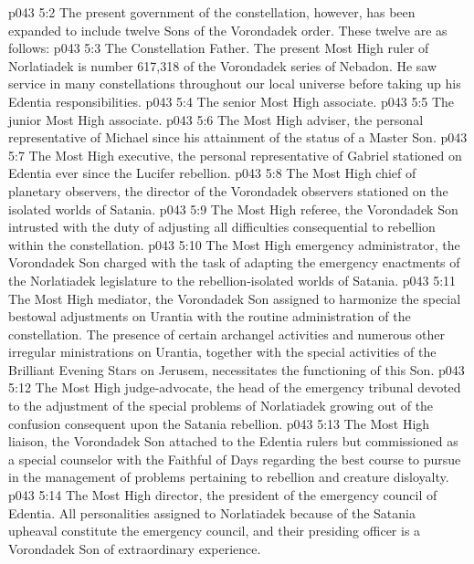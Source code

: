 \vs p043 5:2 The present government of the constellation, however, has been expanded to include twelve Sons of the Vorondadek order. These twelve are as follows:
\pc \vs p043 5:3 \bibnobreakspace The Constellation Father. The present Most High ruler of Norlatiadek is number 617,318 of the Vorondadek series of Nebadon. He saw service in many constellations throughout our local universe before taking up his Edentia responsibilities.
\pc \vs p043 5:4 \bibnobreakspace The senior Most High associate.
\pc \vs p043 5:5 \bibnobreakspace The junior Most High associate.
\pc \vs p043 5:6 \bibnobreakspace The Most High adviser, the personal representative of Michael since his attainment of the status of a Master Son.
\pc \vs p043 5:7 \bibnobreakspace The Most High executive, the personal representative of Gabriel stationed on Edentia ever since the Lucifer rebellion.
\pc \vs p043 5:8 \bibnobreakspace The Most High chief of planetary observers, the director of the Vorondadek observers stationed on the isolated worlds of Satania.\plusone
\pc \vs p043 5:9 \bibnobreakspace The Most High referee, the Vorondadek Son intrusted with the duty of adjusting all difficulties consequential to rebellion within the constellation.
\pc \vs p043 5:10 \bibnobreakspace The Most High emergency administrator, the Vorondadek Son charged with the task of adapting the emergency enactments of the Norlatiadek legislature to the rebellion\hyp{}isolated worlds of Satania.
\pc \vs p043 5:11 \bibnobreakspace The Most High mediator, the Vorondadek Son assigned to harmonize the special bestowal adjustments on Urantia with the routine administration of the constellation. The presence of certain archangel activities and numerous other irregular ministrations on Urantia, together with the special activities of the Brilliant Evening Stars on Jerusem, necessitates the functioning of this Son.
\pc \vs p043 5:12 \bibnobreakspace The Most High judge\hyp{}advocate, the head of the emergency tribunal devoted to the adjustment of the special problems of Norlatiadek growing out of the confusion consequent upon the Satania rebellion.
\pc \vs p043 5:13 \bibnobreakspace The Most High liaison, the Vorondadek Son attached to the Edentia rulers but commissioned as a special counselor with the Faithful of Days regarding the best course to pursue in the management of problems pertaining to rebellion and creature disloyalty.
\pc \vs p043 5:14 \bibnobreakspace The Most High director, the president of the emergency council of Edentia. All personalities assigned to Norlatiadek because of the Satania upheaval constitute the emergency council, and their presiding officer is a Vorondadek Son of extraordinary experience.
